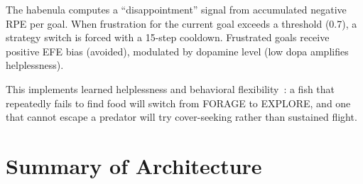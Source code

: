 \documentclass[11pt,a4paper]{article}
\begin{document}
The habenula computes a ``disappointment'' signal from accumulated
negative RPE per goal.  When frustration for the current goal exceeds
a threshold (0.7), a strategy switch is forced with a 15-step
cooldown.  Frustrated goals receive positive EFE bias (avoided),
modulated by dopamine level (low dopa amplifies helplessness).

This implements learned helplessness and behavioral
flexibility~\cite{amo2014}: a fish that repeatedly fails to find
food will switch from FORAGE to EXPLORE, and one that cannot escape
a predator will try cover-seeking rather than sustained flight.

\section{Summary of Architecture}\label{sec:summary}
\end{document}
